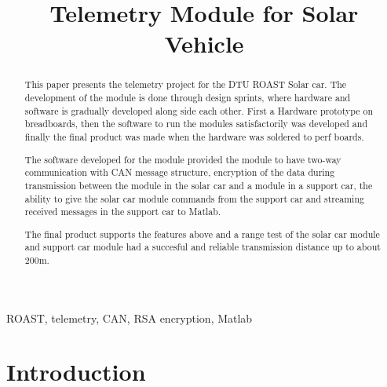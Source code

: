 \documentclass[conference]{IEEEtran}
\begin{document}
\title{Telemetry Module for Solar Vehicle}

\author{
}

\maketitle

\begin{abstract}
This paper presents the telemetry project for the DTU ROAST Solar car. The development of the module is done through design sprints, where hardware and software is gradually developed along side each other. First a Hardware prototype on breadboards, then the software to run the modules satisfactorily was developed and finally the final product was made when the hardware was soldered to perf boards.

The software developed for the module provided the module to have two-way communication with CAN message structure, encryption of the data during transmission between the module in the solar car and a module in a support car, the ability to give the solar car module commands from the support car and streaming received messages in the support car to Matlab.

The final product supports the features above and a range test of the solar car module and support car module had a succesful and reliable transmission distance up to about 200m.
\end{abstract}

\begin{IEEEkeywords}
ROAST, telemetry, CAN, RSA encryption, Matlab
\end{IEEEkeywords}



\section{Introduction}
\end{document}
